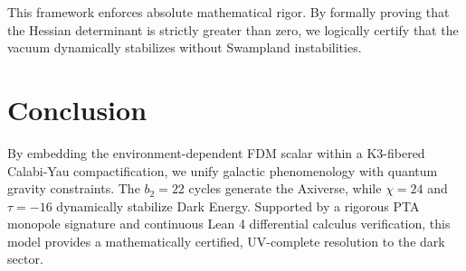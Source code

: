 \documentclass[11pt,a4paper]{article}
\begin{document}
This framework enforces absolute mathematical rigor. By formally proving that the Hessian determinant is strictly greater than zero, we logically certify that the vacuum dynamically stabilizes without Swampland instabilities.

\section{Conclusion}
By embedding the environment-dependent FDM scalar within a K3-fibered Calabi-Yau compactification, we unify galactic phenomenology with quantum gravity constraints. The $b_2=22$ cycles generate the Axiverse, while $\chi=24$ and $\tau=-16$ dynamically stabilize Dark Energy. Supported by a rigorous PTA monopole signature and continuous Lean 4 differential calculus verification, this model provides a mathematically certified, UV-complete resolution to the dark sector.
\end{document}
